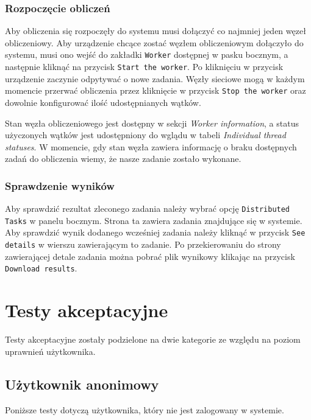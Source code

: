 \documentclass[a4paper,11pt,twoside]{report}
\theoremstyle{definition}
\begin{document}
        \subsubsection{Rozpoczęcie obliczeń}
        
        Aby obliczenia się rozpoczęły do systemu musi dołączyć co najmniej jeden węzeł obliczeniowy. Aby urządzenie chcące zostać węzłem obliczeniowym dołączyło do systemu, musi ono wejść do zakładki \texttt{Worker} dostępnej w pasku bocznym, a następnie kliknąć na przycisk \texttt{Start the worker}.
        Po kliknięciu w przycisk urządzenie zaczynie odpytywać o nowe zadania.
        Węzły sieciowe mogą w każdym momencie przerwać obliczenia przez kliknięcie w przycisk \texttt{Stop the worker} oraz dowolnie konfigurować ilość udostępnianych wątków. 
        
        
        Stan węzła obliczeniowego jest dostępny w sekcji \textit{Worker information}, a status użyczonych wątków jest udostępniony do wglądu w tabeli \textit{Individual thread statuses}. W momencie, gdy stan węzła zawiera informację o braku dostępnych zadań do obliczenia wiemy, że nasze zadanie zostało wykonane.
        
        
        \subsubsection{Sprawdzenie wyników}
        
        Aby sprawdzić rezultat zleconego zadania należy wybrać opcję \texttt{Distributed Tasks} w panelu bocznym.
        Strona ta zawiera zadania znajdujące się w systemie.
        Aby sprawdzić wynik dodanego wcześniej zadania należy kliknąć w przycisk \texttt{See details} w wierszu zawierającym to zadanie.
        Po przekierowaniu do strony zawierającej detale zadania można pobrać plik wynikowy klikając na przycisk \texttt{Download results}.

    
    \section{Testy akceptacyjne}
        
        Testy akceptacyjne zostały podzielone na dwie kategorie ze względu na poziom uprawnień użytkownika.
        
        \subsection{Użytkownik anonimowy}
            Poniższe testy dotyczą użytkownika, który nie jest zalogowany w systemie.
        
\end{document}

